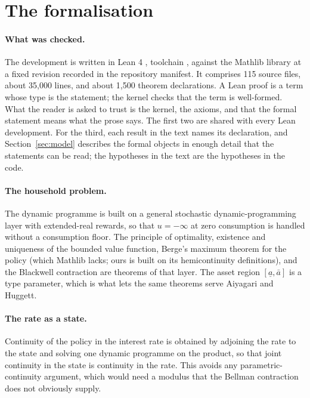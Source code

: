 \section{The formalisation}\label{app:formal}

\paragraph{What was checked.}
The development is written in Lean 4 \citep{Lean4}, toolchain , against the
Mathlib library \citep{Mathlib} at a fixed revision recorded in the repository manifest. It
comprises 115 source files, about 35,000 lines, and about 1,500 theorem declarations. A Lean proof
is a term whose type is the statement; the kernel checks that the term is well-formed. What the
reader is asked to trust is the kernel, the axioms, and that the formal statement means what the
prose says. The first two are shared with every Lean development. For the third, each result in the
text names its declaration, and Section~\ref{sec:model} describes the formal objects in enough
detail that the statements can be read; the hypotheses in the text are the hypotheses in the code.

\paragraph{The household problem.}
The dynamic programme is built on a general stochastic dynamic-programming layer with
extended-real rewards, so that $u=-\infty$ at zero consumption is handled without a consumption
floor. The principle of optimality, existence and uniqueness of the bounded value function,
Berge's maximum theorem for the policy (which Mathlib lacks; ours is built on its hemicontinuity
definitions), and the Blackwell contraction are theorems of that layer. The asset region
$[\underline a,\bar a]$ is a type parameter, which is what lets the same theorems serve Aiyagari and
Huggett.

\paragraph{The rate as a state.}
Continuity of the policy in the interest rate is obtained by adjoining the rate to the state and
solving one dynamic programme on the product, so that joint continuity in the state is continuity
in the rate. This avoids any parametric-continuity argument, which would need a modulus that the
Bellman contraction does not obviously supply.

